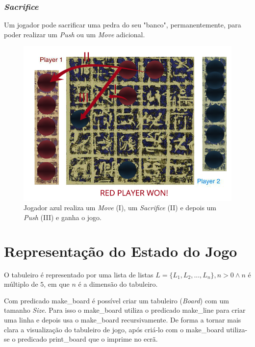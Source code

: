 \documentclass[a4paper]{article}
\begin{document}
\subsubsection{\textit{Sacrifice}}

Um jogador pode sacrificar uma pedra do seu "banco", permanentemente, para poder realizar um \textit{Push} ou um \textit{Move} adicional.

\begin{figure}[!htb]
	\centering
	\includegraphics[scale=0.3]{images/sacrifice.png}
	\caption{Jogador azul realiza um \textit{Move} (I), um \textit{Sacrifice} (II) e depois um \textit{Push} (III) e ganha o jogo.}
\end{figure}

\section{Representação do Estado do Jogo}

O tabuleiro é representado por uma lista de listas  $L = \{L_1, L_2, ... , L_n\} , n > 0  \wedge n$ é múltiplo de $5$, em que $n$ é a dimensão do tabuleiro. \par
Com predicado make\_board é possível criar um tabuleiro (\textit{Board}) com um tamanho \textit{Size}. Para isso o make\_board utiliza o predicado make\_line para criar uma linha e depois usa o make\_board recursivamente. De forma a tornar mais clara a visualização do tabuleiro de jogo, após criá-lo com o make\_board utiliza-se o predicado print\_board que o imprime no ecrã.
\end{document}
